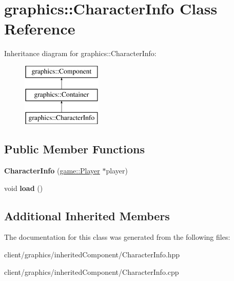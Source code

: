 \hypertarget{classgraphics_1_1_character_info}{\section{graphics\-:\-:Character\-Info Class Reference}
\label{classgraphics_1_1_character_info}
}
Inheritance diagram for graphics\-:\-:Character\-Info\-:\begin{figure}[H]
\begin{center}
\leavevmode
\includegraphics[height=3.000000cm]{classgraphics_1_1_character_info}
\end{center}
\end{figure}
\subsection*{Public Member Functions}
\begin{DoxyCompactItemize}
\item 
\hypertarget{classgraphics_1_1_character_info_aca6581ab497d35c0cdeec65e4caa89ee}{{\bfseries Character\-Info} (\hyperlink{classgame_1_1_player}{game\-::\-Player} $\ast$player)}\label{classgraphics_1_1_character_info_aca6581ab497d35c0cdeec65e4caa89ee}

\item 
\hypertarget{classgraphics_1_1_character_info_ace92d4a47b8997ffcfe193bf728407d9}{void {\bfseries load} ()}\label{classgraphics_1_1_character_info_ace92d4a47b8997ffcfe193bf728407d9}

\end{DoxyCompactItemize}
\subsection*{Additional Inherited Members}


The documentation for this class was generated from the following files\-:\begin{DoxyCompactItemize}
\item 
client/graphics/inherited\-Component/Character\-Info.\-hpp\item 
client/graphics/inherited\-Component/Character\-Info.\-cpp\end{DoxyCompactItemize}
